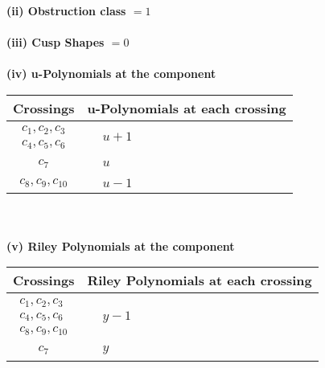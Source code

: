 \documentclass[1p]{elsarticle_modified}
\theoremstyle{definition}
\begin{document}
\flushleft \textbf{(ii) Obstruction class $= 1$}\\~\\
\flushleft \textbf{(iii) Cusp Shapes $= 0$}\\~\\
\newpage\renewcommand{\arraystretch}{1}
\flushleft \textbf{(iv) u-Polynomials at the component}\newline \\
\begin{tabular}{m{50pt}|m{274pt}}
Crossings & \hspace{64pt}u-Polynomials at each crossing \\
\hline $$\begin{aligned}c_{1},c_{2},c_{3}\\c_{4},c_{5},c_{6}\end{aligned}$$&$\begin{aligned}
&u+1
\end{aligned}$\\
\hline $$\begin{aligned}c_{7}\end{aligned}$$&$\begin{aligned}
&u
\end{aligned}$\\
\hline $$\begin{aligned}c_{8},c_{9},c_{10}\end{aligned}$$&$\begin{aligned}
&u-1
\end{aligned}$\\
\hline
\end{tabular}\\~\\
\newpage\renewcommand{\arraystretch}{1}
\flushleft \textbf{(v) Riley Polynomials at the component}\newline \\
\begin{tabular}{m{50pt}|m{274pt}}
Crossings & \hspace{64pt}Riley Polynomials at each crossing \\
\hline $$\begin{aligned}c_{1},c_{2},c_{3}\\c_{4},c_{5},c_{6}\\c_{8},c_{9},c_{10}\end{aligned}$$&$\begin{aligned}
&y-1
\end{aligned}$\\
\hline $$\begin{aligned}c_{7}\end{aligned}$$&$\begin{aligned}
&y
\end{aligned}$\\
\hline
\end{tabular}\\~\\
\end{document}
